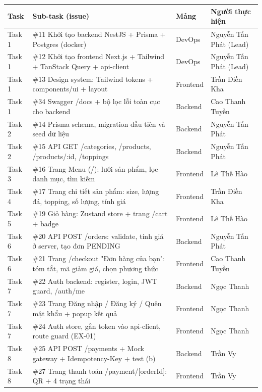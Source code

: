 \begin{longtable}{|p{2.3cm}|p{7.2cm}|p{1.6cm}|p{3.2cm}|}
\hline \textbf{Task} & \textbf{Sub-task (issue)} & \textbf{Mảng} & \textbf{Người thực hiện} \\ \hline \endhead
Task 1 & \#11 Khởi tạo backend NestJS + Prisma + Postgres (docker) & DevOps & Nguyễn Tấn Phát (Lead) \\ \hline
Task 1 & \#12 Khởi tạo frontend Next.js + Tailwind + TanStack Query + api-client & DevOps & Nguyễn Tấn Phát (Lead) \\ \hline
Task 1 & \#13 Design system: Tailwind tokens + components/ui + layout & Frontend & Trần Điền Kha \\ \hline
Task 1 & \#34 Swagger /docs + bộ lọc lỗi toàn cục cho backend & Backend & Cao Thanh Tuyền \\ \hline
Task 2 & \#14 Prisma schema, migration đầu tiên và seed dữ liệu & Backend & Nguyễn Tấn Phát \\ \hline
Task 2 & \#15 API GET /categories, /products, /products/:id, /toppings & Backend & Nguyễn Tấn Phát \\ \hline
Task 3 & \#16 Trang Menu (/): lưới sản phẩm, lọc danh mục, tìm kiếm & Frontend & Lê Thế Hào \\ \hline
Task 4 & \#17 Trang chi tiết sản phẩm: size, lượng đá, topping, số lượng, tính giá & Frontend & Trần Điền Kha \\ \hline
Task 5 & \#19 Giỏ hàng: Zustand store + trang /cart + badge & Frontend & Lê Thế Hào \\ \hline
Task 6 & \#20 API POST /orders: validate, tính giá ở server, tạo đơn PENDING & Backend & Nguyễn Tấn Phát \\ \hline
Task 6 & \#21 Trang /checkout "Đơn hàng của bạn": tóm tắt, mã giảm giá, chọn phương thức & Frontend & Cao Thanh Tuyền \\ \hline
Task 7 & \#22 Auth backend: register, login, JWT guard, /auth/me & Backend & Ngọc Thanh \\ \hline
Task 7 & \#23 Trang Đăng nhập / Đăng ký / Quên mật khẩu + popup kết quả & Frontend & Ngọc Thanh \\ \hline
Task 7 & \#24 Auth store, gắn token vào api-client, route guard (EX-01) & Frontend & Ngọc Thanh \\ \hline
Task 8 & \#25 API POST /payments + Mock gateway + Idempotency-Key + test (b) & Backend & Trần Vy \\ \hline
Task 8 & \#27 Trang thanh toán /payment/[orderId]: QR + 4 trạng thái & Frontend & Trần Vy \\ \hline

\end{longtable}
